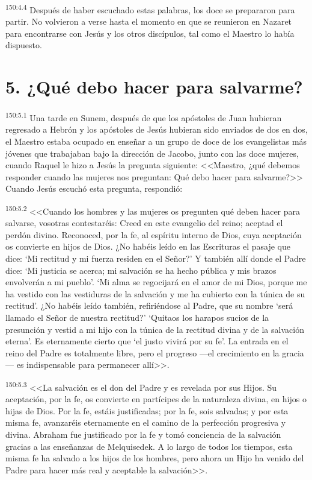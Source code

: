 \par 
\textsuperscript{150:4.4} Después de haber escuchado estas palabras, los doce se prepararon para partir. No volvieron a verse hasta el momento en que se reunieron en Nazaret para encontrarse con Jesús y los otros discípulos, tal como el Maestro lo había dispuesto.

\section*{5. ¿Qué debo hacer para salvarme?}
\par 
\textsuperscript{150:5.1} Una tarde en Sunem, después de que los apóstoles de Juan hubieran regresado a Hebrón y los apóstoles de Jesús hubieran sido enviados de dos en dos, el Maestro estaba ocupado en enseñar a un grupo de doce de los evangelistas más jóvenes que trabajaban bajo la dirección de Jacobo, junto con las doce mujeres, cuando Raquel le hizo a Jesús la pregunta siguiente: <<Maestro, ¿qué debemos responder cuando las mujeres nos preguntan: Qué debo hacer para salvarme?>> Cuando Jesús escuchó esta pregunta, respondió:

\par 
\textsuperscript{150:5.2} <<Cuando los hombres y las mujeres os pregunten qué deben hacer para salvarse, vosotras contestaréis: Creed en este evangelio del reino; aceptad el perdón divino. Reconoced, por la fe, al espíritu interno de Dios, cuya aceptación os convierte en hijos de Dios. ¿No habéis leído en las Escrituras el pasaje que dice: `Mi rectitud y mi fuerza residen en el Señor?' Y también allí donde el Padre dice: `Mi justicia se acerca; mi salvación se ha hecho pública y mis brazos envolverán a mi pueblo'. `Mi alma se regocijará en el amor de mi Dios, porque me ha vestido con las vestiduras de la salvación y me ha cubierto con la túnica de su rectitud'. ¿No habéis leído también, refiriéndose al Padre, que su nombre `será llamado el Señor de nuestra rectitud?' `Quitaos los harapos sucios de la presunción y vestid a mi hijo con la túnica de la rectitud divina y de la salvación eterna'. Es eternamente cierto que `el justo vivirá por su fe'. La entrada en el reino del Padre es totalmente libre, pero el progreso ---el crecimiento en la gracia--- es indispensable para permanecer allí>>.

\par 
\textsuperscript{150:5.3} <<La salvación es el don del Padre y es revelada por sus Hijos. Su aceptación, por la fe, os convierte en partícipes de la naturaleza divina, en hijos o hijas de Dios. Por la fe, estáis justificadas; por la fe, sois salvadas; y por esta misma fe, avanzaréis eternamente en el camino de la perfección progresiva y divina. Abraham fue justificado por la fe y tomó conciencia de la salvación gracias a las enseñanzas de Melquisedek. A lo largo de todos los tiempos, esta misma fe ha salvado a los hijos de los hombres, pero ahora un Hijo ha venido del Padre para hacer más real y aceptable la salvación>>.

